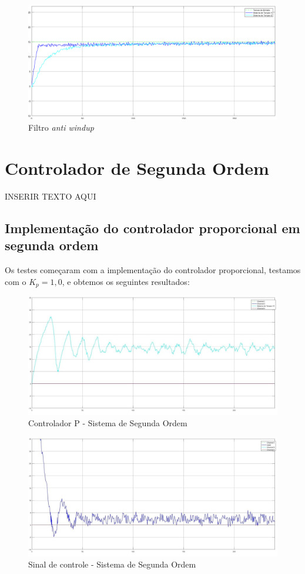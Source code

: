\documentclass[
	12pt,				%
	openany,			%
	oneside,			%
	a4paper,			%
	english,			%
	french,				%
	spanish,			%
	brazil,				%
	]{abntex2}
\begin{document}
{\begin{figure}[h]
	\centering
	\includegraphics[scale=0.25]{Filtro_windup_1.png}
	\caption{Filtro \textit{anti windup}}
\end{figure}

\section{Controlador de Segunda Ordem}

 INSERIR TEXTO AQUI
 
\subsection{Implementação do controlador proporcional em segunda ordem}
 
Os testes começaram com a implementação do controlador proporcional, testamos com o $K_p = 1,0$, e obtemos os seguintes resultados:

\begin{figure}[h]
	\centering
	\includegraphics[scale=0.50]{7 - controlador_P_SO.jpg}
	\caption{Controlador P - Sistema de Segunda Ordem}
\end{figure}

\begin{figure}[h]
	\centering
	\includegraphics[scale=0.50]{7 - sinal_controle_P_SO.jpg}
	\caption{Sinal de controle - Sistema de Segunda Ordem}
\end{figure}

}
\end{document}
